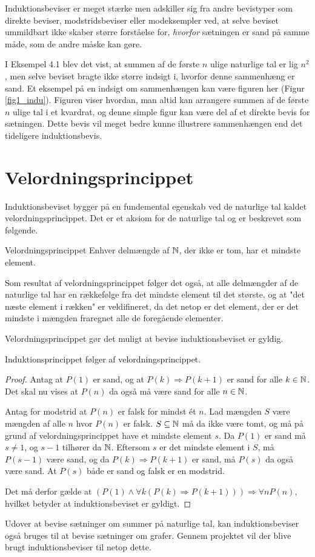 Induktionsbeviser er meget stærke men adskiller sig fra andre bevistyper som direkte beviser, modstridsbeviser eller modeksempler ved, at selve beviset ummildbart ikke skaber større forståelse for, \textit{hvorfor} sætningen er sand på samme måde, som de andre måske kan gøre.

I Eksempel 4.1 blev det vist, at summen af de første $n$ ulige naturlige tal er lig $n^2$, men selve beviset bragte ikke større indsigt i, hvorfor denne sammenhæng er sand.
Et eksempel på en indsigt om sammenhængen kan være figuren her (Figur \ref{fig1_indu}).
Figuren viser hvordan, man altid kan arrangere summen af de første $n$ ulige tal i et kvardrat, og denne simple figur kan være del af et direkte bevis for sætningen.
Dette bevis vil meget bedre kunne illustrere sammenhængen end det tideligere induktionsbevis.

\section{Velordningsprincippet}
Induktionsbeviset bygger på en fundemental egenskab ved de naturlige tal kaldet velordningsprincippet.
Det er et aksiom for de naturlige tal og er beskrevet som følgende.
\begin{theorembox}{Velordningsprincippet}
	Enhver delmængde af $\mathbb{N}$, der ikke er tom, har et mindste element.
\end{theorembox}
\noindent Som resultat af velordningsprincippet følger det også, at alle delmængder af de naturlige tal har en rækkefølge fra det mindste element til det største, og at "det næste element i rækken" er veldifineret, da det netop er det element, der er det mindste i mængden fraregnet alle de foregående elementer.

Velordningsprincippet gør det muligt at bevise induktionsbeviset er gyldig.

\begin{thm}
	Induktionsprincippet følger af velordningsprincippet.
\end{thm}

\begin{proof}
	Antag at $P(1)$ er sand, og at $P(k) \Rightarrow P(k + 1)$ er sand for alle $k \in \mathbb{N}$.
	Det skal nu vises at $P(n)$ da også må være sand for alle $n \in \mathbb{N}$.

	Antag for modstrid at $P(n)$ er falsk for mindst ét $n$.
	Lad mængden $S$ være mængden af alle $n$ hvor $P(n)$ er falsk.
	$S \subseteq \mathbb{N}$ må da ikke være tomt, og må på grund af velordningsprincippet have et mindste element $s$.
	Da $P(1)$ er sand må $s \neq 1$, og $s - 1$ tilhører da $\mathbb{N}$.
	Eftersom $s$ er det mindste element i $S$, må $P(s - 1)$ være sand, og da $P(k) \Rightarrow P(k+1)$ er sand, må $P(s)$ da også være sand.
	At $P(s)$ både er sand og falsk er en modstrid.

	Det må derfor gælde at $(P(1) \land \forall k ( P(k) \Rightarrow P(k + 1))) \Rightarrow \forall n P(n)$, hvilket betyder at induktionsbeviset er gyldigt.
\end{proof}

Udover at bevise sætninger om summer på naturlige tal, kan induktionsbeviser også bruges til at bevise sætninger om grafer.
Gennem projektet vil der blive brugt induktionsbeviser til netop dette.
